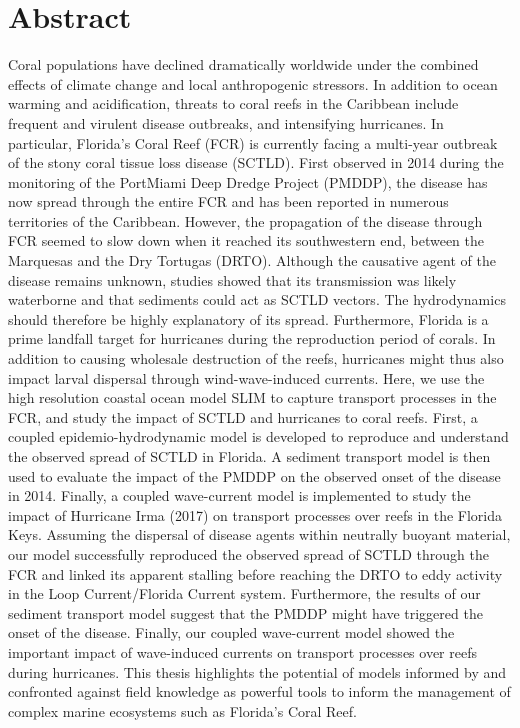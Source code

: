 
\chapter*{Abstract}

Coral populations have declined dramatically worldwide under the combined effects of climate change and local anthropogenic stressors. In addition to ocean warming and acidification, threats to coral reefs in the Caribbean include frequent and virulent disease outbreaks, and intensifying hurricanes. In particular, Florida's Coral Reef (FCR) is currently facing a multi-year outbreak of the stony coral tissue loss disease (SCTLD). First observed in 2014 during the monitoring of the PortMiami Deep Dredge Project (PMDDP), the disease has now spread through the entire FCR and has been reported in numerous territories of the Caribbean. However, the propagation of the disease through FCR seemed to slow down when it reached its southwestern end, between the Marquesas and the Dry Tortugas (DRTO). Although the causative agent of the disease remains unknown, studies showed that its transmission was likely waterborne and that sediments could act as SCTLD vectors. The hydrodynamics should therefore be highly explanatory of its spread. Furthermore, Florida is a prime landfall target for hurricanes during the reproduction period of corals. In addition to causing wholesale destruction of the reefs, hurricanes might thus also impact larval dispersal through wind-wave-induced currents. Here, we use the high resolution coastal ocean model SLIM to capture transport processes in the FCR, and study the impact of SCTLD and hurricanes to coral reefs. First, a coupled epidemio-hydrodynamic model is developed to reproduce and understand the observed spread of SCTLD in Florida. A sediment transport model is then used to evaluate the impact of the PMDDP on the observed onset of the disease in 2014. Finally, a coupled wave-current model is implemented to study the impact of Hurricane Irma (2017) on transport processes over reefs in the Florida Keys. Assuming the dispersal of disease agents within neutrally buoyant material, our model successfully reproduced the observed spread of SCTLD through the FCR and linked its apparent stalling before reaching the DRTO to eddy activity in the Loop Current/Florida Current system. Furthermore, the results of our sediment transport model suggest that the PMDDP might have triggered the onset of the disease. Finally, our coupled wave-current model showed the important impact of wave-induced currents on transport processes over reefs during hurricanes. This thesis highlights the potential of models informed by and confronted against field knowledge as powerful tools to inform the management of complex marine ecosystems such as Florida's Coral Reef.